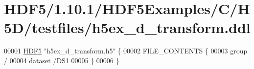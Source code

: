 \hypertarget{_h_d_f5_21_810_81_2_h_d_f5_examples_2_c_2_h5_d_2testfiles_2h5ex__d__transform_8ddl_source}{}\section{H\+D\+F5/1.10.1/\+H\+D\+F5\+Examples/\+C/\+H5\+D/testfiles/h5ex\+\_\+d\+\_\+transform.ddl}
\label{_h_d_f5_21_810_81_2_h_d_f5_examples_2_c_2_h5_d_2testfiles_2h5ex__d__transform_8ddl_source}

\begin{DoxyCode}
00001 \hyperlink{namespace_h_d_f5}{HDF5} \textcolor{stringliteral}{"h5ex\_d\_transform.h5"} \{
00002 FILE\_CONTENTS \{
00003  group      /
00004  dataset    /DS1
00005  \}
00006 \}
\end{DoxyCode}
